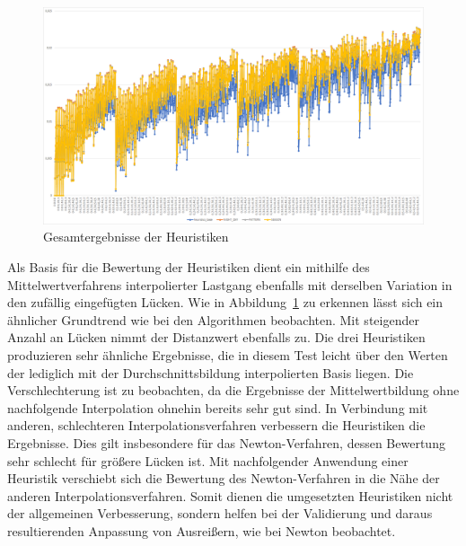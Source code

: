 \begin{figure}[!t]
	\begin{center}
		\includegraphics[width=0.9\columnwidth]{pics/evaluation-heuristics}
	\end{center}
	\caption{\label{fig:evaluation_heuristics}Gesamtergebnisse der Heuristiken}
\end{figure}

Als Basis für die Bewertung der Heuristiken dient ein mithilfe des Mittelwertverfahrens interpolierter Lastgang ebenfalls mit derselben Variation in den zufällig eingefügten Lücken. Wie in Abbildung~\ref{fig:evaluation_heuristics} zu erkennen lässt sich ein ähnlicher Grundtrend wie bei den Algorithmen beobachten. Mit steigender Anzahl an Lücken nimmt der Distanzwert ebenfalls zu. Die drei Heuristiken produzieren sehr ähnliche Ergebnisse, die in diesem Test leicht über den Werten der lediglich mit der Durchschnittsbildung interpolierten Basis liegen.
Die Verschlechterung ist zu beobachten, da die Ergebnisse der Mittelwertbildung ohne nachfolgende Interpolation ohnehin bereits sehr gut sind. In Verbindung mit anderen, schlechteren Interpolationsverfahren verbessern die Heuristiken die Ergebnisse. Dies gilt insbesondere für das Newton-Verfahren, dessen Bewertung sehr schlecht für größere Lücken ist. Mit nachfolgender Anwendung einer Heuristik verschiebt sich die Bewertung des Newton-Verfahren in die Nähe der anderen Interpolationsverfahren.
Somit dienen die umgesetzten Heuristiken nicht der allgemeinen Verbesserung, sondern helfen bei der Validierung und daraus resultierenden Anpassung von Ausreißern, wie bei Newton beobachtet.